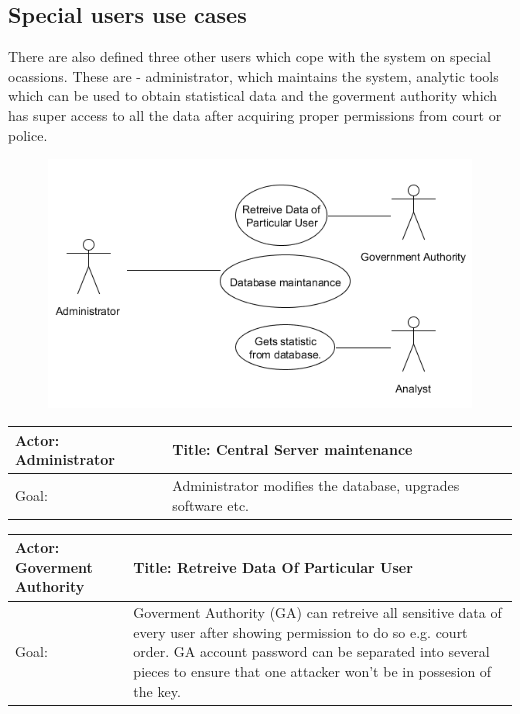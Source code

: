 \subsection{Special users use cases}

There are also defined three other users which cope with the system on special ocassions.
These are - administrator, which maintains the system, analytic tools which can be used to obtain statistical data and the goverment authority which has super access to all the data after acquiring proper permissions from court or police.

\begin{figure}[h]
\begin{center}
\includegraphics[width=1\textwidth]{database/specialUseCases.png}
\end{center}
\end{figure} 

\begin{table}[h]
    \begin{tabular}{| p{6cm} | p{7.75cm} |}
    \hline
    Actor: Administrator &Title: Central Server maintenance \\ \hline
    Goal: & Administrator modifies the database, upgrades software etc. \\ \hline
    \end{tabular}
\end{table}

\begin{table}[h]
    \begin{tabular}{| p{6cm} | p{7.75cm} |}
    \hline
    Actor: Goverment Authority &Title: Retreive Data Of Particular User \\ \hline
    Goal: & Goverment Authority (GA) can retreive all sensitive data of every user after showing permission to do so e.g. court order. GA account password can be separated into several pieces to ensure that one attacker won't be in possesion of the key. \\ \hline
    \end{tabular}
\end{table}

